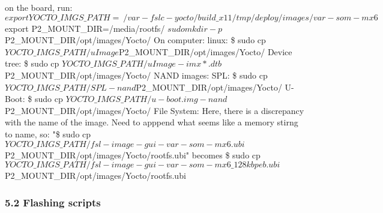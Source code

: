 \documentclass[10pt]{article}
\begin{document}
        on the board, run:
            $ export YOCTO\_IMGS\_PATH=~/var-fslc-yocto/build\_x11/tmp/deploy/images/var-som-mx6
            $ export P2\_MOUNT\_DIR=/media/rootfs/
            $ sudo mkdir -p ${P2\_MOUNT\_DIR}/opt/images/Yocto/
        On computer:
            linux:
                \$ sudo cp ${YOCTO\_IMGS\_PATH}/uImage ${P2\_MOUNT\_DIR}/opt/images/Yocto/
            Device tree:
                \$ sudo cp ${YOCTO\_IMGS\_PATH}/uImage-imx*.dtb ${P2\_MOUNT\_DIR}/opt/images/Yocto/
            NAND images:
                SPL:
                    \$ sudo cp ${YOCTO\_IMGS\_PATH}/SPL-nand ${P2\_MOUNT\_DIR}/opt/images/Yocto/
                U-Boot:
                    \$ sudo cp ${YOCTO\_IMGS\_PATH}/u-boot.img-nand ${P2\_MOUNT\_DIR}/opt/images/Yocto/
                File System: Here, there is a discrepancy with the name of the image. Need to apppend what seems like a memory stirng to name, so:
                    "\$ sudo cp ${YOCTO\_IMGS\_PATH}/fsl-image-gui-var-som-mx6.ubi ${P2\_MOUNT\_DIR}/opt/images/Yocto/rootfs.ubi" becomes
                    \$ sudo cp ${YOCTO\_IMGS\_PATH}/fsl-image-gui-var-som-mx6\_128kbpeb.ubi ${P2\_MOUNT\_DIR}/opt/images/Yocto/rootfs.ubi
    \subsubsection{5.2 Flashing scripts}




%
\end{document}

